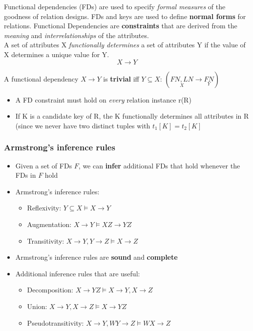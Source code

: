 Functional dependencies (FDs) are used to specify \textit{formal measures} of the goodness of relation designs. FDs and keys are used to define \textbf{normal forms} for relations. Functional Dependencies are \textbf{constraints} that are derived from the \textit{meaning} and \textit{interrelationships} of the attributes.\\

A set of attributes X \textit{functionally determines} a set of attributes Y if the value of X determines a unique value for Y. \[X \rightarrow Y\]

A functional dependency $X\rightarrow Y$ is \textbf{trivial} iff $Y\subseteq X$: \quad $(\underset{X}{FN,LN} \rightarrow \underset{Y}{FN})$ \label{trivial}\\

\begin{itemize}[label=\(\rhd\)]
    \item A FD constraint must hold on \textit{every} relation instance r(R)
    \item If K is a candidate key of R, the K functionally determines all attributes in R (since we never have two distinct tuples with $t_1[K]=t_2[K]$ 
\end{itemize}



\subsubsection{Armstrong's inference rules}
\begin{itemize}[label=\(\rhd\)]
    \item Given a set of FDs $F$, we can \textbf{infer} additional FDs that hold whenever the FDs in $F$ hold
    \item Armstrong's inference rules:
    \begin{itemize}[label=\(\rhd\)]
        \item Reflexivity: $Y\subseteq X \models X\rightarrow Y$
        \item Augmentation: $X \rightarrow Y \models XZ \rightarrow YZ$
        \item Transitivity: $X\rightarrow Y, Y \rightarrow Z \models X \rightarrow Z$
    \end{itemize}
    \item Armstrong's inference rules are \textbf{sound} and \textbf{complete}
    \item Additional inference rules that are useful:
    \begin{itemize}[label=\(\rhd\)]
        \item Decomposition: $X\rightarrow YZ \models X \rightarrow Y, X \rightarrow Z$
        \item Union: $X \rightarrow Y, X \rightarrow Z \models X \rightarrow YZ$
        \item Pseudotransitivity: $X \rightarrow Y, WY \rightarrow Z \models WX \rightarrow Z$
    \end{itemize}
\end{itemize}

